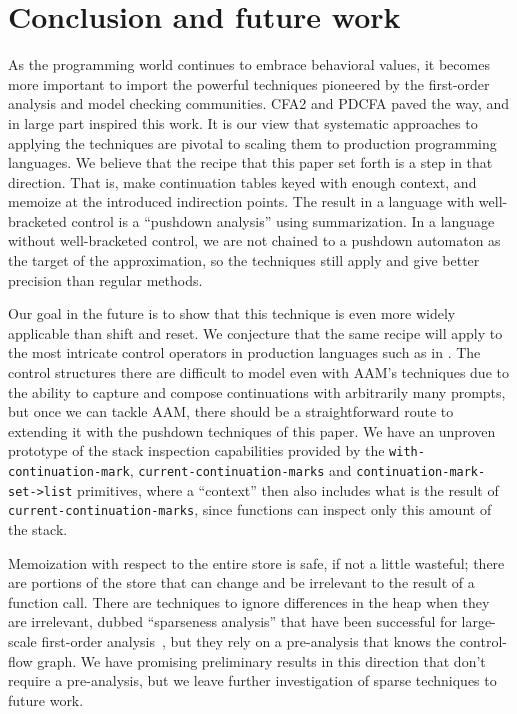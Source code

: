 \section{Conclusion and future work}

As the programming world continues to embrace behavioral values, it becomes more important to import the powerful techniques pioneered by the first-order analysis and model checking communities.
%
CFA2 and PDCFA paved the way, and in large part inspired this work.
%
It is our view that systematic approaches to applying the techniques are pivotal to scaling them to production programming languages.
%
We believe that the recipe that this paper set forth is a step in that direction.
%
That is, make continuation tables keyed with enough context, and memoize at the introduced indirection points.
%
The result in a language with well-bracketed control is a ``pushdown analysis'' using summarization.
%
In a language without well-bracketed control, we are not chained to a pushdown automaton as the target of the approximation, so the techniques still apply and give better precision than regular methods.

Our goal in the future is to show that this technique is even more widely applicable than shift and reset.
%
We conjecture that the same recipe will apply to the most intricate control operators in production languages such as in \citet{ianjohnson:Flatt:2007:ADC:1291151.1291178}.
%
The control structures there are difficult to model even with AAM's techniques due to the ability to capture and compose continuations with arbitrarily many prompts, but once we can tackle AAM, there should be a straightforward route to extending it with the pushdown techniques of this paper.
%
We have an unproven prototype of the stack inspection capabilities provided by the {\tt with-continuation-mark}, {\tt current-continuation-marks} and {\tt continuation-mark-set->list} primitives, where a ``context'' then also includes what is the result of {\tt current-continuation-marks}, since functions can inspect only this amount of the stack.

Memoization with respect to the entire store is safe, if not a little wasteful; there are portions of the store that can change and be irrelevant to the result of a function call.
%
There are techniques to ignore differences in the heap when they are irrelevant, dubbed ``sparseness analysis'' that have been successful for large-scale first-order analysis~\citep{ianjohnson:DBLP:conf/pldi/OhHLLY12}, but they rely on a pre-analysis that knows the control-flow graph.
%
We have promising preliminary results in this direction that don't require a pre-analysis, but we leave further investigation of sparse techniques to future work.

